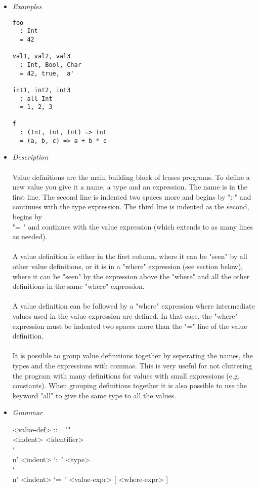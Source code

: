 \documentclass{article}
\begin{document}
\begin{itemize}

\item \textit{Examples}

\begin{verbatim}
foo
  : Int
  = 42

val1, val2, val3
  : Int, Bool, Char
  = 42, true, 'a'

int1, int2, int3
  : all Int
  = 1, 2, 3

f
  : (Int, Int, Int) => Int
  = (a, b, c) => a + b * c
\end{verbatim}

\item \textit{Description}\\\\
Value definitions are the main building block of lcases programs. To define a
new value you give it a name, a type and an expression. The name is in the
first line. The second line is indented two spaces more and begins by ": " and
continues with the type expression. The third line is indented as the second,
begins by \\ "= " and continues with the value expression (which extends to as
many lines as needed).
\\\\
A value definition is either in the first column, where it can be "seen" by all
other value definitions, or it is in a "where" expression (see section below),
where it can be "seen" by the expression above the "where" and all the other
definitions in the same "where" expression.
\\\\
A value definition can be followed by a "where" expression where intermediate
values used in the value expression are defined. In that case, the "where"
expression must be indented two spaces more than the "=" line of the value
definition.
\\\\
It is possible to group value definitions together by seperating the names, the
types and the expressions with commas. This is very useful for not cluttering
the program with many definitions for values with small expressions (e.g.
constants).  When grouping definitions together it is also possible to use the
keyword "all" to give the same type to all the values.

\item \textit{Grammar}
\begin{grammar}
<value-def> ::= ""\\
<indent> <identifier> \\
`\\n' <indent> `:\ ' <type> \\
`\\n' <indent> `=\ ' <value-expr> [ <where-expr> ]


\end{grammar}
\end{itemize}
\end{document}
